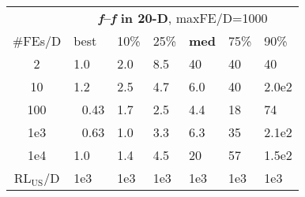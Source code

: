 \begin{tabular}{c|llllll}
 & \multicolumn{6}{|c}{\textbf{\textit{f}\raisebox{-0.35ex}{1}--\textit{f}\raisebox{-0.35ex}{24} in 20-D}, maxFE/D=1000}\\
\#FEs/D & best & 10\% & 25\% & \textbf{med} & 75\% & 90\%\\
2 & \hspace*{1ex}1.0 & \hspace*{1ex}2.0 & \hspace*{1ex}8.5 & 40 & 40 & 40\\
10 & \hspace*{1ex}1.2 & \hspace*{1ex}2.5 & \hspace*{1ex}4.7 & \hspace*{1ex}6.0 & 40 & 2.0e2\\
100 & ~\,0.43 & \hspace*{1ex}1.7 & \hspace*{1ex}2.5 & \hspace*{1ex}4.4 & 18 & 74\\
1e3 & ~\,0.63 & \hspace*{1ex}1.0 & \hspace*{1ex}3.3 & \hspace*{1ex}6.3 & 35 & 2.1e2\\
1e4 & \hspace*{1ex}1.0 & \hspace*{1ex}1.4 & \hspace*{1ex}4.5 & 20 & 57 & 1.5e2\\
$\text{RL}_{\text{US}}$/D & 1e3 & 1e3 & 1e3 & 1e3 & 1e3 & 1e3
\end{tabular}
